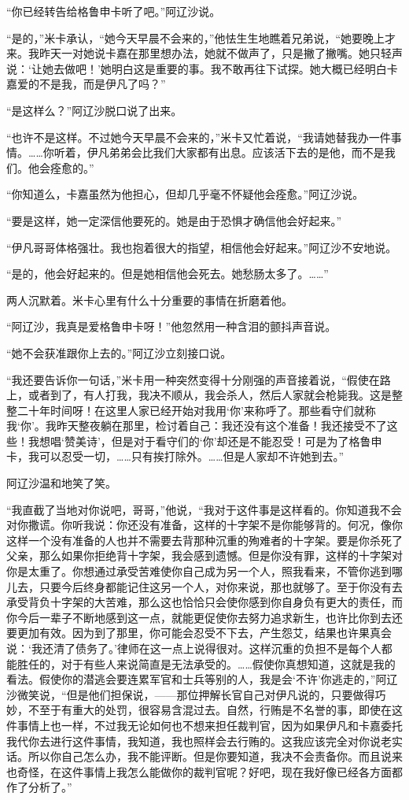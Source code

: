 \par “你已经转告给格鲁申卡听了吧。”阿辽沙说。
\par “是的，”米卡承认，“她今天早晨不会来的，”他怯生生地瞧着兄弟说，“她要晚上才来。我昨天一对她说卡嘉在那里想办法，她就不做声了，只是撇了撇嘴。她只轻声说：‘让她去做吧！’她明白这是重要的事。我不敢再往下试探。她大概已经明白卡嘉爱的不是我，而是伊凡了吗？”
\par “是这样么？”阿辽沙脱口说了出来。
\par “也许不是这样。不过她今天早晨不会来的，”米卡又忙着说，“我请她替我办一件事情。……你听着，伊凡弟弟会比我们大家都有出息。应该活下去的是他，而不是我们。他会痊愈的。”
\par “你知道么，卡嘉虽然为他担心，但却几乎毫不怀疑他会痊愈。”阿辽沙说。
\par “要是这样，她一定深信他要死的。她是由于恐惧才确信他会好起来。”
\par “伊凡哥哥体格强壮。我也抱着很大的指望，相信他会好起来。”阿辽沙不安地说。
\par “是的，他会好起来的。但是她相信他会死去。她愁肠太多了。……”
\par 两人沉默着。米卡心里有什么十分重要的事情在折磨着他。
\par “阿辽沙，我真是爱格鲁申卡呀！”他忽然用一种含泪的颤抖声音说。
\par “她不会获准跟你上去的。”阿辽沙立刻接口说。
\par “我还要告诉你一句话，”米卡用一种突然变得十分刚强的声音接着说，“假使在路上，或者到了，有人打我，我决不顺从，我会杀人，然后人家就会枪毙我。这是整整二十年时间呀！在这里人家已经开始对我用‘你’来称呼了。那些看守们就称我‘你’。我昨天整夜躺在那里，检讨着自己：我还没有这个准备！我还接受不了这些！我想唱‘赞美诗’，但是对于看守们的‘你’却还是不能忍受！可是为了格鲁申卡，我可以忍受一切，……只有挨打除外。……但是人家却不许她到去。”
\par 阿辽沙温和地笑了笑。
\par “我直截了当地对你说吧，哥哥，”他说，“我对于这件事是这样看的。你知道我不会对你撒谎。你听我说：你还没有准备，这样的十字架不是你能够背的。何况，像你这样一个没有准备的人也并不需要去背那种沉重的殉难者的十字架。要是你杀死了父亲，那么如果你拒绝背十字架，我会感到遗憾。但是你没有罪，这样的十字架对你是太重了。你想通过承受苦难使你自己成为另一个人，照我看来，不管你逃到哪儿去，只要今后终身都能记住这另一个人，对你来说，那也就够了。至于你没有去承受背负十字架的大苦难，那么这也恰恰只会使你感到你自身负有更大的责任，而你今后一辈子不断地感到这一点，就能更促使你去努力追求新生，也许比你到去还要更加有效。因为到了那里，你可能会忍受不下去，产生怨艾，结果也许果真会说：‘我还清了债务了。’律师在这一点上说得很对。这样沉重的负担不是每个人都能胜任的，对于有些人来说简直是无法承受的。……假使你真想知道，这就是我的看法。假使你的潜逃会要连累军官和士兵等别的人，我是会‘不许’你逃走的，”阿辽沙微笑说，“但是他们担保说，——那位押解长官自己对伊凡说的，只要做得巧妙，不至于有重大的处罚，很容易含混过去。自然，行贿是不名誉的事，即使在这件事情上也一样，不过我无论如何也不想来担任裁判官，因为如果伊凡和卡嘉委托我代你去进行这件事情，我知道，我也照样会去行贿的。这我应该完全对你说老实话。所以你自己怎么办，我不能评断。但是你要知道，我决不会责备你。而且说来也奇怪，在这件事情上我怎么能做你的裁判官呢？好吧，现在我好像已经各方面都作了分析了。”
